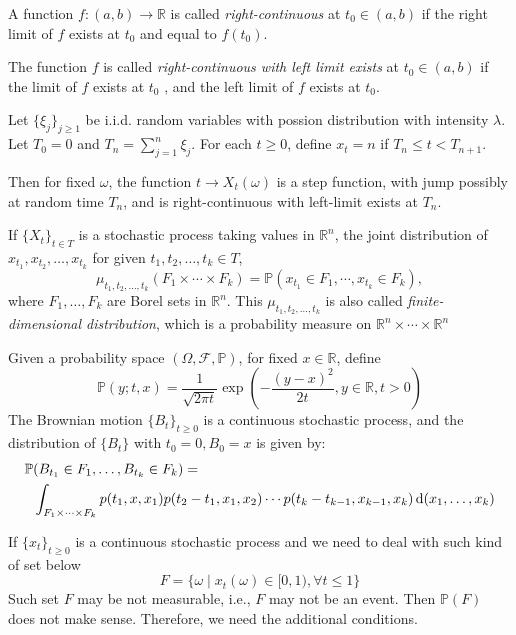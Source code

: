 \begin{remark}
A function $f:(a,b)\to\mathbb{R}$ is called \emph{right-continuous} at $t_0\in(a,b)$ if the right limit of $f$ exists at $t_0$ and equal to $f(t_0)$.

The function $f$ is called \emph{right-continuous with left limit exists} at $t_0\in(a,b)$ if the limit of $f$ exists at $t_0$ , and the left limit of $f$ exists at $t_0$.
\end{remark}

\begin{example}
Let $\{\xi_j\}_{j\ge1}$ be i.i.d. random variables with possion distribution with intensity $\lambda$. Let $T_0=0$ and $T_n=\sum_{j=1}^n\xi_j$. For each $t\ge0$, define $x_t=n$ if $T_n\le t<T_{n+1}$.

Then for fixed $\omega$, the function $t\to X_t(\omega)$ is a step function, with jump possibly at random time $T_n$, and is right-continuous with left-limit exists at $T_n$.
\end{example}
\begin{definition}
If $\{X_t\}_{t\in T}$ is a stochastic process taking values in $\mathbb{R}^n$, the joint distribution of $x_{t_1},x_{t_2},\dots,x_{t_k}$ for given $t_1,t_2,\dots,t_k\in T$,
\[
\mu_{t_1,t_2,\dots,t_k}(F_1\times\cdots\times F_k)
=
\mathbb{P}(x_{t_1}\in F_1,\cdots,x_{t_k}\in F_k),
\]
where $F_1,\dots,F_k$ are Borel sets in $\mathbb{R}^n$. This $\mu_{t_1,t_2,\dots,t_k}$ is also called \emph{finite-dimensional distribution}, which is a probability measure on $\mathbb{R}^n\times\cdots\times\mathbb{R}^n$
\end{definition}

\begin{example}
Given a probability space $(\Omega,\mathcal{F},\mathbb{P})$, for fixed $x\in\mathbb{R}$, define
\[
\mathbb{P}(y;t,x)=\frac{1}{\sqrt{2\pi t}}\exp\left(
-\frac{(y-x)^2}{2t},y\in\mathbb{R},t>0
\right)
\]
The Brownian motion $\{B_t\}_{t\ge0}$ is a continuous stochastic process, and the distribution of $\{B_t\}$ with $t_0=0,B_0=x$ is given by:
\[
\begin{aligned}
\mathbb{P}&(B_{t_1}\in F_1,\dots,B_{t_k}\in F_k)
=\\
&\int_{F_1\times\cdots\times F_k}p(t_1,x,x_1)p(t_2-t_1,x_1,x_2)\cdots p(t_k-t_{k-1},x_{k-1},x_k)\,\mathrm{d}(x_1,\dots,x_k)
\end{aligned}
\]

\end{example}
\begin{remark}
If $\{x_t\}_{t\ge0}$ is a continuous stochastic process and we need to deal with such kind of set below
\[
F=\{\omega\mid x_t(\omega)\in[0,1),\forall t\le1\}
\]
Such set $F$ may be not measurable, i.e., $F$ may not be an event. Then $\mathbb{P}(F)$ does not make sense. Therefore, we need the additional conditions.
\end{remark}
